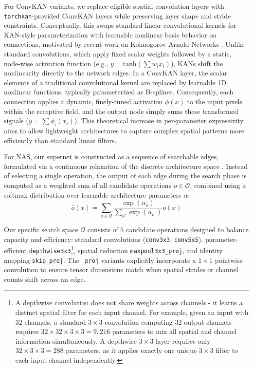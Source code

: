 \documentclass[cameraready]{Interspeech}
\begin{document}
For ConvKAN variants, we replace eligible spatial convolution layers with \texttt{torchkan}-provided \cite{torchkan} ConvKAN layers while preserving layer shape and stride constraints. Conceptually, this swaps standard linear convolutional kernels for KAN-style parameterization with learnable nonlinear basis behavior on connections, motivated by recent work on Kolmogorov-Arnold Networks \cite{liu2024kan,10681070_kan}. Unlike standard convolutions, which apply fixed scalar weights followed by a static, node-wise activation function (e.g., $y = \text{tanh}(\sum w_i x_i)$), KANs shift the nonlinearity directly to the network edges. In a ConvKAN layer, the scalar elements of a traditional convolutional kernel are replaced by learnable 1D nonlinear functions, typically parameterized as B-splines.  Consequently, each connection applies a dynamic, finely-tuned activation $\phi(x)$ to the input pixels within the receptive field, and the output node simply sums these transformed signals ($y = \sum \phi_i(x_i)$). This theoretical increase in per-parameter expressivity aims to allow lightweight architectures to capture complex spatial patterns more efficiently than standard linear filters.

For NAS, our supernet is constructed as a sequence of searchable edges, formulated via a continuous relaxation of the discrete architecture space \cite{liu2018darts}.  Instead of selecting a single operation, the output of each edge during the search phase is computed as a weighted sum of all candidate operations $o \in \mathcal{O}$, combined using a softmax distribution over learnable architecture parameters $\alpha$:
$$ \bar{o}(x) = \sum_{o \in \mathcal{O}} \frac{\exp(\alpha_o)}{\sum_{o'} \exp(\alpha_{o'})} o(x) $$

Our specific search space $\mathcal{O}$ consists of $5$ candidate operations designed to balance capacity and efficiency: standard convolutions (\texttt{conv3x3}, \texttt{conv5x5}), parameter-efficient \texttt{depthwise3x3}\footnote{A depthwise convolution does not share weights across channels - it learns a distinct spatial filter for each input channel. For example, given an input with $32$ channels, a standard $3\times3$ convolution computing $32$ output channels requires $32 \times 32 \times 3 \times 3 = 9{,}216$ parameters to mix all spatial and channel information simultaneously. A depthwise $3\times3$ layer requires only $32 \times 3 \times 3 = 288$ parameters, as it applies exactly one unique $3\times3$ filter to each input channel independently.}, spatial reduction \texttt{maxpool3x3\_proj}, and identity mapping \texttt{skip\_proj}. The \texttt{\_proj} variants explicitly incorporate a $1 \times 1$ pointwise convolution to ensure tensor dimensions match when spatial strides or channel counts shift across an edge.
\end{document}
